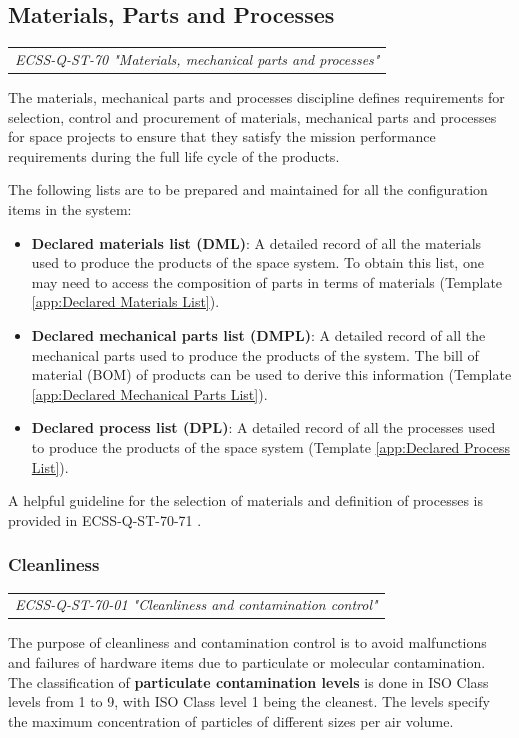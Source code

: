 \subsection{Materials, Parts and Processes}

\begin{tabular}{l}
\textit{ECSS-Q-ST-70 "Materials, mechanical parts and processes" \cite{ECSS-Q-ST-70}}
\end{tabular}

The materials, mechanical parts and processes discipline defines requirements for selection, control and procurement of materials, mechanical parts and processes for space projects to ensure that they satisfy the mission performance requirements during the full life cycle of the products. 

The following lists are to be prepared and maintained for all the configuration items in the system:

\begin{itemize}
\item \textbf{Declared materials list (DML)}: A detailed record of all the materials used to produce the products of the space system. To obtain this list, one may need to access the composition of parts in terms of materials (Template \ref{app:Declared Materials List}).
\item \textbf{Declared mechanical parts list (DMPL)}: A detailed record of all the mechanical parts used to produce the products of the system. The bill of material (BOM) of products can be used to derive this information (Template \ref{app:Declared Mechanical Parts List}).
\item \textbf{Declared process list (DPL)}: A detailed record of all the processes used to produce the products of the space system (Template \ref{app:Declared Process List}).
\end{itemize}

A helpful guideline for the selection of materials and definition of processes is provided in ECSS-Q-ST-70-71 \cite{ECSS-Q-ST-70-71}.

\subsubsection{Cleanliness}

\begin{tabular}{l}
\textit{ECSS-Q-ST-70-01 "Cleanliness and contamination control" \cite{ECSS-Q-ST-70-01}}
\end{tabular}

The purpose of cleanliness and contamination control is to avoid malfunctions and failures of hardware items due to particulate or molecular contamination. The classification of \textbf{particulate contamination levels} is done in ISO Class levels from 1 to 9, with ISO Class level 1 being the cleanest. The levels specify the maximum concentration of particles of different sizes per air volume.

